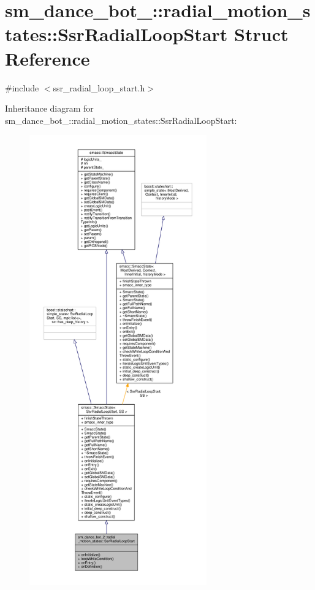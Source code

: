 \hypertarget{structsm__dance__bot__2_1_1radial__motion__states_1_1SsrRadialLoopStart}{}\section{sm\+\_\+dance\+\_\+bot\+\_\+:\+:radial\+\_\+motion\+\_\+states\+:\+:Ssr\+Radial\+Loop\+Start Struct Reference}
\label{structsm__dance__bot__2_1_1radial__motion__states_1_1SsrRadialLoopStart}


{\ttfamily \#include $<$ssr\+\_\+radial\+\_\+loop\+\_\+start.\+h$>$}



Inheritance diagram for sm\+\_\+dance\+\_\+bot\+\_\+:\+:radial\+\_\+motion\+\_\+states\+:\+:Ssr\+Radial\+Loop\+Start\+:\nopagebreak
\begin{figure}[H]
\begin{center}
\leavevmode
\includegraphics[height=550pt]{structsm__dance__bot__2_1_1radial__motion__states_1_1SsrRadialLoopStart__inherit__graph}
\end{center}
\end{figure}


